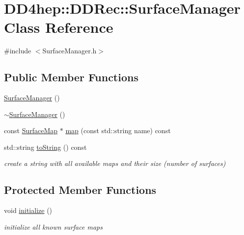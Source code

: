 \hypertarget{class_d_d4hep_1_1_d_d_rec_1_1_surface_manager}{}\section{D\+D4hep\+:\+:D\+D\+Rec\+:\+:Surface\+Manager Class Reference}
\label{class_d_d4hep_1_1_d_d_rec_1_1_surface_manager}


{\ttfamily \#include $<$Surface\+Manager.\+h$>$}

\subsection*{Public Member Functions}
\begin{DoxyCompactItemize}
\item 
\hyperlink{class_d_d4hep_1_1_d_d_rec_1_1_surface_manager_ade79c900350308b6523dd7964e156af3}{Surface\+Manager} ()
\item 
\hyperlink{class_d_d4hep_1_1_d_d_rec_1_1_surface_manager_aaa040a3a6384a601d1c3bc1e79ba4f3f}{$\sim$\+Surface\+Manager} ()
\item 
const \hyperlink{namespace_d_d4hep_1_1_d_d_rec_a04db40c967eb23286f472ac1c17931d1}{Surface\+Map} $\ast$ \hyperlink{class_d_d4hep_1_1_d_d_rec_1_1_surface_manager_a6ad4b9616553a050c273937767cea902}{map} (const std\+::string name) const
\item 
std\+::string \hyperlink{class_d_d4hep_1_1_d_d_rec_1_1_surface_manager_ad631f3c718f85235cd42915cf2b66178}{to\+String} () const
\begin{DoxyCompactList}\small\item\em create a string with all available maps and their size (number of surfaces) \end{DoxyCompactList}\end{DoxyCompactItemize}
\subsection*{Protected Member Functions}
\begin{DoxyCompactItemize}
\item 
void \hyperlink{class_d_d4hep_1_1_d_d_rec_1_1_surface_manager_a418776e91006ad305f08e6bfde675ec9}{initialize} ()
\begin{DoxyCompactList}\small\item\em initialize all known surface maps \end{DoxyCompactList}\end{DoxyCompactItemize}

